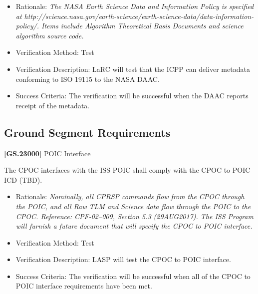 \begin{itemize}
\item{} Rationale: \emph{The NASA Earth Science Data and Information Policy is specified at http:\slash \slash science.nasa.gov\slash earth-science\slash earth-science-data\slash data-information-policy\slash . Items include Algorithm Theoretical Basis Documents and science algorithm source code.}

\item{} Verification Method: Test

\item{} Verification Description: \gls{LaRC} will \gls{test} that the \gls{ICPP} can deliver metadata conforming to ISO 19115 to the NASA \gls{DAAC}.

\item{} Success Criteria: The verification will be successful when the \gls{DAAC} reports receipt of the metadata.

\end{itemize}

\subsection{Ground Segment Requirements}
\label{groundsegmentrequirements}

\textbf{[GS.23000]} \gls{POIC} Interface

The \gls{CPOC} interfaces with the \gls{ISS} \gls{POIC} shall comply with the \gls{CPOC} to \gls{POIC} ICD (TBD).

\begin{itemize}
\item{} Rationale: \emph{Nominally, all CPRSP commands flow from the CPOC through the POIC, and all Raw TLM and Science data flow through the POIC to the CPOC. Reference: CPF-02--009, Section 5.3 (29AUG2017). The ISS Program will furnish a future document that will specify the CPOC to POIC interface.}

\item{} Verification Method: Test

\item{} Verification Description: \gls{LASP} will \gls{test} the \gls{CPOC} to \gls{POIC} interface.

\item{} Success Criteria: The verification will be successful when all of the \gls{CPOC} to \gls{POIC} interface requirements have been met.

\end{itemize}

